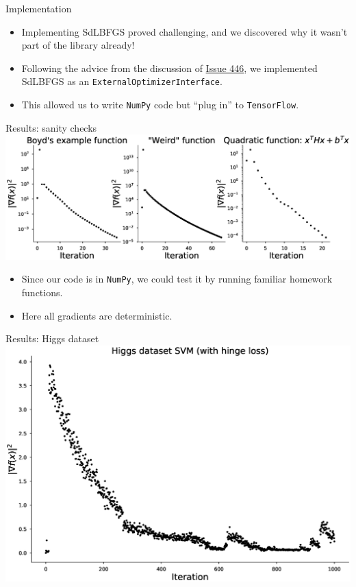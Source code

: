 \documentclass{beamer}
\begin{document}
\begin{frame}[t]{Implementation}
  \begin{itemize}
    \item Implementing SdLBFGS proved challenging, and we discovered why it wasn't
      part of the library already!
    \item Following the advice from the discussion of 
      \href{https://github.com/tensorflow/tensorflow/issues/446}{Issue 446}, we
      implemented SdLBFGS as an \texttt{ExternalOptimizerInterface}.
    \item This allowed us to write \texttt{NumPy} code but ``plug in'' to
      \texttt{TensorFlow}.
  \end{itemize}
\end{frame}

\begin{frame}[t]{Results: sanity checks}
  \includegraphics[width=\textwidth]{../plots/sanity_checks.eps} 
  \begin{itemize}
    \item Since our code is in \texttt{NumPy}, we could test it by running
      familiar homework functions.
    \item Here all gradients are deterministic.
  \end{itemize}
\end{frame}


\begin{frame}[t]{Results: Higgs dataset}
  \includegraphics[width=\textwidth]{../plots/higgs_dataset.eps} 
\end{frame}

\begin{frame}
  
\end{frame}
\end{document}
